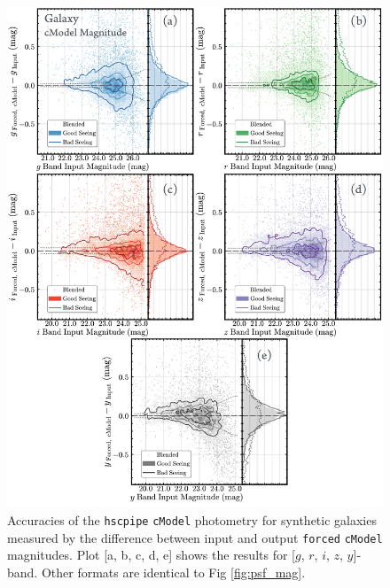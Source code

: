 \documentclass[useamsfonts]{pasj01}
\def\cmodel{\texttt{cModel}}
\def\forced{\texttt{forced}}
\begin{document}
\begin{figure}
    \begin{center}
        \includegraphics[width=16cm]{fig/synpipe_galaxy_mag}
    \end{center}
    \caption{
        Accuracies of the \texttt{hscpipe} \cmodel{} photometry for synthetic 
        galaxies measured by the difference between input and output \forced{} 
        \cmodel{} magnitudes. 
        Plot [a, b, c, d, e] shows the results for [$g$, $r$, $i$, $z$, $y$]-band. 
        Other formats are identical to Fig \ref{fig:psf_mag}.
        }
    \label{fig:cmodel_mag}
\end{figure}
\end{document}
